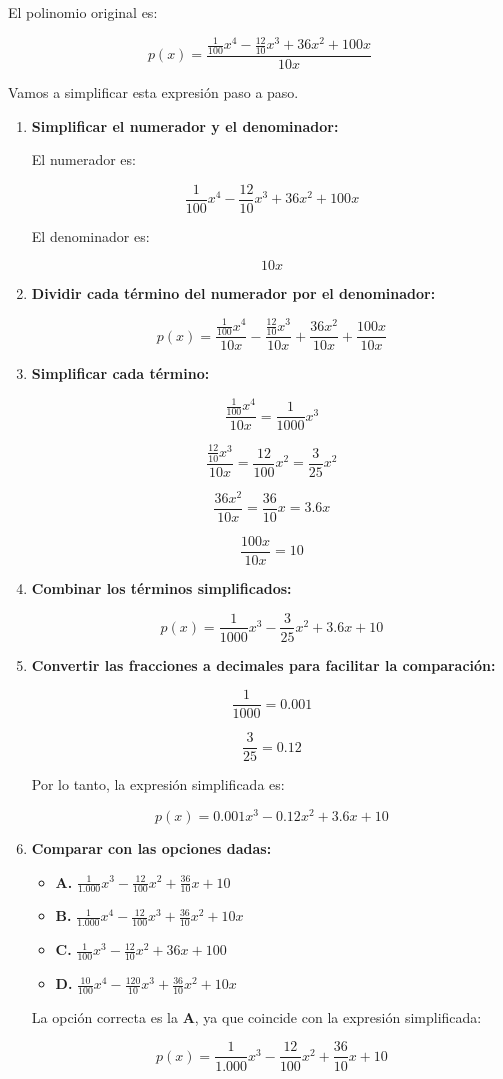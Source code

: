 \documentclass[
]{article}
\providecommand{\tightlist}{%
  \setlength{\itemsep}{0pt}\setlength{\parskip}{0pt}}
\begin{document}
El polinomio original es:

\[ p(x) = \frac{\frac{1}{100} x^4 - \frac{12}{10} x^3 + 36x^2 + 100x}{10x} \]

Vamos a simplificar esta expresión paso a paso.

\begin{enumerate}
\def\labelenumi{\arabic{enumi}.}
\item
  \textbf{Simplificar el numerador y el denominador:}

  El numerador es:

  \[ \frac{1}{100} x^4 - \frac{12}{10} x^3 + 36x^2 + 100x \]

  El denominador es:

  \[ 10x \]
\item
  \textbf{Dividir cada término del numerador por el denominador:}

  \[
  p(x) = \frac{\frac{1}{100} x^4}{10x} - \frac{\frac{12}{10} x^3}{10x} + \frac{36x^2}{10x} + \frac{100x}{10x}
  \]
\item
  \textbf{Simplificar cada término:}

  \[
  \frac{\frac{1}{100} x^4}{10x} = \frac{1}{1000} x^3
  \]

  \[
  \frac{\frac{12}{10} x^3}{10x} = \frac{12}{100} x^2 = \frac{3}{25} x^2
  \]

  \[
  \frac{36x^2}{10x} = \frac{36}{10} x = 3.6x
  \]

  \[
  \frac{100x}{10x} = 10
  \]
\item
  \textbf{Combinar los términos simplificados:}

  \[
  p(x) = \frac{1}{1000} x^3 - \frac{3}{25} x^2 + 3.6x + 10
  \]
\item
  \textbf{Convertir las fracciones a decimales para facilitar la
  comparación:}

  \[
  \frac{1}{1000} = 0.001
  \]

  \[
  \frac{3}{25} = 0.12
  \]

  Por lo tanto, la expresión simplificada es:

  \[
  p(x) = 0.001x^3 - 0.12x^2 + 3.6x + 10
  \]
\item
  \textbf{Comparar con las opciones dadas:}

  \begin{itemize}
  \tightlist
  \item
    \textbf{A.}
    \(\frac{1}{1.000} x^3 - \frac{12}{100} x^2 + \frac{36}{10} x + 10\)
  \item
    \textbf{B.}
    \(\frac{1}{1.000} x^4 - \frac{12}{100} x^3 + \frac{36}{10} x^2 + 10x\)
  \item
    \textbf{C.} \(\frac{1}{100} x^3 - \frac{12}{10} x^2 + 36x + 100\)
  \item
    \textbf{D.}
    \(\frac{10}{100} x^4 - \frac{120}{10} x^3 + \frac{36}{10} x^2 + 10x\)
  \end{itemize}

  La opción correcta es la \textbf{A}, ya que coincide con la expresión
  simplificada:

  \[
  p(x) = \frac{1}{1.000} x^3 - \frac{12}{100} x^2 + \frac{36}{10} x + 10
  \]
\end{enumerate}
\end{document}
